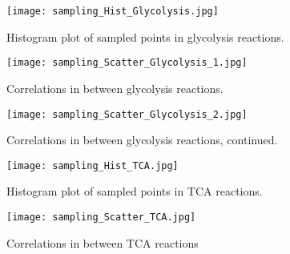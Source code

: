 \begin{landscape}
 \begin{figure}[H]
    \begin{sidewaysfigure}
     \texttt{[image: sampling\_Hist\_Glycolysis.jpg]}
    \end{sidewaysfigure}
 \caption[Histogram plots of available flux values for glycolysis reactions]{Histogram plot of sampled points in glycolysis reactions.}
 \label{fig:sampling_Hist_Glycolysis}
 \end{figure}

 \begin{figure}[H]
    \begin{sidewaysfigure}
     \texttt{[image: sampling\_Scatter\_Glycolysis\_1.jpg]}
    \end{sidewaysfigure}
 \caption[Correlations in between glycolysis reactions]{Correlations in between glycolysis reactions.}
 \label{fig:sampling_Scatter_Glycolysis_1}
 \end{figure}

 \begin{figure}[H]
   \begin{sidewaysfigure}
    \texttt{[image: sampling\_Scatter\_Glycolysis\_2.jpg]}
    \end{sidewaysfigure}
 \caption[Correlations in between glycolysis reactions, continued]{Correlations in between glycolysis reactions, continued.}
 \label{fig:sampling_Scatter_Glycolysis_2}
 \end{figure}

  \begin{figure}[H]
     \begin{sidewaysfigure}
      \texttt{[image: sampling\_Hist\_TCA.jpg]}
     \end{sidewaysfigure}
  \caption[Histogram plots of available flux values for TCA reactions]{Histogram plot of sampled points in TCA reactions.}
  \label{fig:sampling_Hist_TCA}
  \end{figure}

  \begin{figure}[H]
   \begin{center}
     \begin{sidewaysfigure}
      \texttt{[image: sampling\_Scatter\_TCA.jpg]}
     \end{sidewaysfigure}
   \end{center}
  \caption[Correlations in between TCA reactions]{Correlations in between TCA reactions}
  \label{fig:sampling_Scatter_TCA}
  \end{figure}


\end{landscape}
